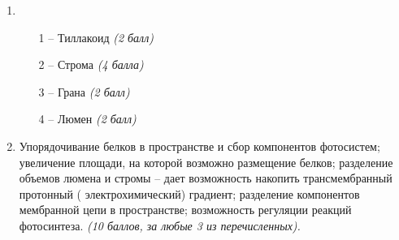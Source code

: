 \solutionSection
\begin{enumerate}
    \item
    \begin{enumerate}
    \item [1 –] Тиллакоид \textit{(2 балл)}
    \item [2 –] Строма \textit{(4 балла)}
    \item [3 –] Грана \textit{(2 балл)}
    \item [4 –] Люмен \textit{(2 балл)}
    \end{enumerate}
    \item Упорядочивание белков в пространстве и сбор компонентов фотосистем; увеличение площади, на которой возможно размещение белков;  разделение объемов люмена и стромы – дает возможность накопить трансмембранный протонный ( электрохимический) градиент; разделение  компонентов мембранной цепи в пространстве;  возможность регуляции реакций фотосинтеза. \textit{(10 баллов, за любые 3 из перечисленных).}
\end{enumerate}